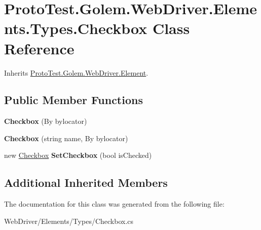 \hypertarget{class_proto_test_1_1_golem_1_1_web_driver_1_1_elements_1_1_types_1_1_checkbox}{\section{Proto\-Test.\-Golem.\-Web\-Driver.\-Elements.\-Types.\-Checkbox Class Reference}
\label{class_proto_test_1_1_golem_1_1_web_driver_1_1_elements_1_1_types_1_1_checkbox}
}


Inherits \hyperlink{class_proto_test_1_1_golem_1_1_web_driver_1_1_element}{Proto\-Test.\-Golem.\-Web\-Driver.\-Element}.

\subsection*{Public Member Functions}
\begin{DoxyCompactItemize}
\item 
\hypertarget{class_proto_test_1_1_golem_1_1_web_driver_1_1_elements_1_1_types_1_1_checkbox_a5dd45dfbeb8a1bdb739c626875f9c85a}{{\bfseries Checkbox} (By bylocator)}\label{class_proto_test_1_1_golem_1_1_web_driver_1_1_elements_1_1_types_1_1_checkbox_a5dd45dfbeb8a1bdb739c626875f9c85a}

\item 
\hypertarget{class_proto_test_1_1_golem_1_1_web_driver_1_1_elements_1_1_types_1_1_checkbox_a696ddb6b42011406caccc246429a8847}{{\bfseries Checkbox} (string name, By bylocator)}\label{class_proto_test_1_1_golem_1_1_web_driver_1_1_elements_1_1_types_1_1_checkbox_a696ddb6b42011406caccc246429a8847}

\item 
\hypertarget{class_proto_test_1_1_golem_1_1_web_driver_1_1_elements_1_1_types_1_1_checkbox_ab0d1b2ff1ba54cda20c0a50439215bf4}{new \hyperlink{class_proto_test_1_1_golem_1_1_web_driver_1_1_elements_1_1_types_1_1_checkbox}{Checkbox} {\bfseries Set\-Checkbox} (bool is\-Checked)}\label{class_proto_test_1_1_golem_1_1_web_driver_1_1_elements_1_1_types_1_1_checkbox_ab0d1b2ff1ba54cda20c0a50439215bf4}

\end{DoxyCompactItemize}
\subsection*{Additional Inherited Members}


The documentation for this class was generated from the following file\-:\begin{DoxyCompactItemize}
\item 
Web\-Driver/\-Elements/\-Types/Checkbox.\-cs\end{DoxyCompactItemize}
